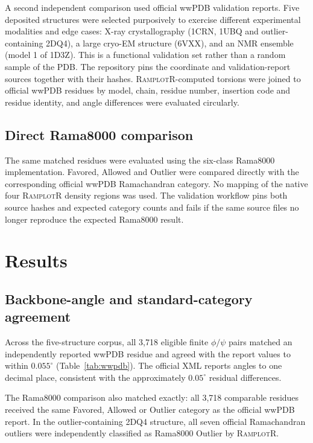 \documentclass[11pt]{article}
\newcommand{\ramplotr}{\textsc{RamplotR}\xspace}
\newcommand{\degree}{^\circ}
\begin{document}
A second independent comparison used official wwPDB validation reports. Five deposited structures were selected purposively to exercise different experimental modalities and edge cases: X-ray crystallography (1CRN, 1UBQ and outlier-containing 2DQ4), a large cryo-EM structure (6VXX), and an NMR ensemble (model 1 of 1D3Z). This is a functional validation set rather than a random sample of the PDB. The repository pins the coordinate and validation-report sources together with their hashes. \ramplotr-computed torsions were joined to official wwPDB residues by model, chain, residue number, insertion code and residue identity, and angle differences were evaluated circularly.

\subsection{Direct Rama8000 comparison}

The same matched residues were evaluated using the six-class Rama8000 implementation. Favored, Allowed and Outlier were compared directly with the corresponding official wwPDB Ramachandran category. No mapping of the native four \ramplotr density regions was used. The validation workflow pins both source hashes and expected category counts and fails if the same source files no longer reproduce the expected Rama8000 result.

\section{Results}

\subsection{Backbone-angle and standard-category agreement}

Across the five-structure corpus, all 3,718 eligible finite $\phi/\psi$ pairs matched an independently reported wwPDB residue and agreed with the report values to within $0.055\degree$ (Table~\ref{tab:wwpdb}). The official XML reports angles to one decimal place, consistent with the approximately $0.05\degree$ residual differences.

The Rama8000 comparison also matched exactly: all 3,718 comparable residues received the same Favored, Allowed or Outlier category as the official wwPDB report. In the outlier-containing 2DQ4 structure, all seven official Ramachandran outliers were independently classified as Rama8000 Outlier by \ramplotr.
\end{document}
